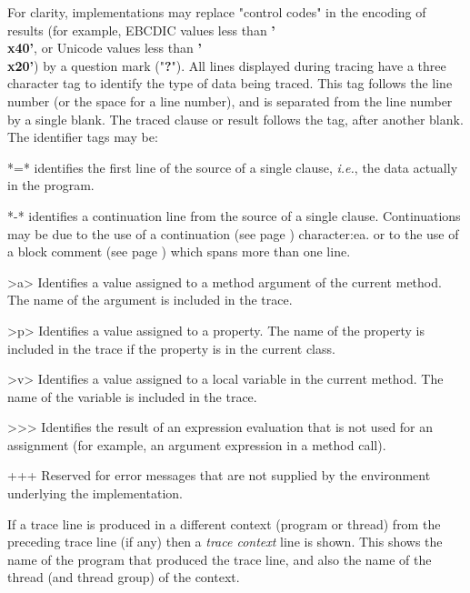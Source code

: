 For clarity, implementations may replace "control codes"
in the encoding of results (for example, EBCDIC values less
than \textbf{'\\x40'}, or Unicode values less than \textbf{'\\x20'})
by a question mark ("\textbf{?}").
 All lines displayed during tracing have a three character tag to
identify the type of data being traced.  This tag follows the line
number (or the space for a line number), and is separated from the line
number by a single blank.
The traced clause or result follows the tag, after another
blank.
The identifier tags may be:
\begin{description}
\item{*=*}
identifies the first line of the source of a single clause, \emph{i.e.},
the data actually in the program.
\item{*-*}
identifies a continuation line from the source of a single clause.
Continuations may be due to the use of a  continuation (see page \pageref{refsemis}) 
character:ea. or to the use of a  block comment (see page \pageref{refblockco}) 
which spans more than one line.
\item{>a>}
Identifies a value assigned to a method argument of the current
method.
The name of the argument is included in the trace.
\item{>p>}
Identifies a value assigned to a property.
The name of the property is included in the trace if the property is in
the current class.
\item{>v>}
Identifies a value assigned to a local variable in the current
method.
The name of the variable is included in the trace.
\item{>>>}
Identifies the result of an expression evaluation that is not used
for an assignment (for example, an argument expression in a method
call).
\item{+++}
Reserved for error messages that are not supplied by the environment
underlying the implementation.
\end{description}

If a trace line is produced in a different context (program or thread)
from the preceding trace line (if any) then a \emph{trace context}
line is shown.  This shows the name of the program that produced the
trace line, and also the name of the thread (and thread group) of the
context.
 
